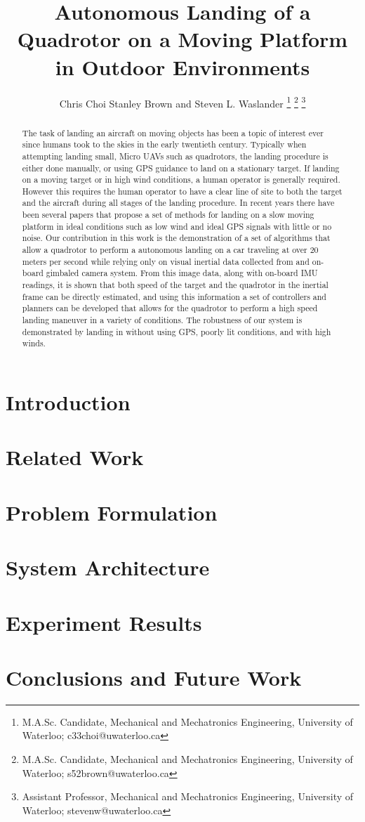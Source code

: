 \documentclass[letterpaper, 10 pt, conference]{ieeeconf}
\title{\large{\textbf{Autonomous Landing of a Quadrotor on a Moving Platform in Outdoor Environments}}}
\author{
Chris Choi\authorrefmark{1} Stanley Brown\authorrefmark{2} and  Steven L. Waslander\authorrefmark{3}
\thanks{\superscript{*} M.A.Sc. Candidate, Mechanical and Mechatronics Engineering, University of Waterloo; c33choi@uwaterloo.ca}
\thanks{\superscript{2} M.A.Sc. Candidate, Mechanical and Mechatronics Engineering, University of Waterloo; s52brown@uwaterloo.ca}
\thanks{\superscript{\dag} Assistant Professor, Mechanical and Mechatronics Engineering, University of Waterloo; stevenw@uwaterloo.ca}
\vspace{0.5in}
}
\begin{document}
\maketitle
\thispagestyle{empty}
\pagestyle{empty}

\begin{abstract}
The task of landing an aircraft on moving objects has been a topic of interest ever since humans took to the skies in the early twentieth century. Typically when attempting landing small, Micro UAVs such as quadrotors, the landing procedure is either done manually, or using GPS guidance to land on a stationary target. If landing on a moving target or in high wind conditions, a human operator is generally required. However this requires the human operator to have a clear line of site to both the target and the aircraft during all stages of the landing procedure. In recent years there have been several papers that propose a set of methods for landing on a slow moving platform in ideal conditions such as low wind and ideal GPS signals with little or no noise. Our contribution in this work is the demonstration of a set of algorithms that allow a quadrotor to perform a autonomous landing on a car traveling at over 20 meters per second while relying only on visual inertial data collected from and on-board gimbaled camera system. From this image data, along with on-board IMU readings, it is shown that both speed of the target and the quadrotor in the inertial frame can be directly estimated, and using this information a set of controllers and planners can be developed that allows for the quadrotor to perform a high speed landing maneuver in a variety of conditions. The robustness of our system is demonstrated by landing in without using GPS, poorly lit conditions, and with high winds. 
\end{abstract}


\section{Introduction}


\section{Related Work}


\section{Problem Formulation}


\section{System Architecture}


\section{Experiment Results}


\section{Conclusions and Future Work}

 
 
 


\end{document}
